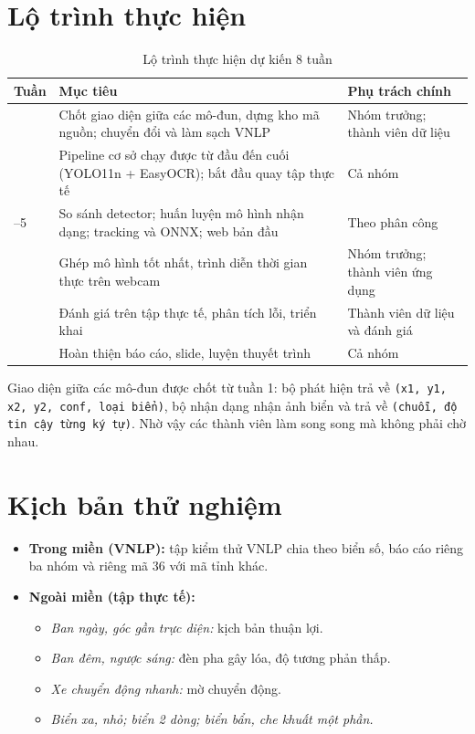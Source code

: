 \section{Lộ trình thực hiện}

\begin{table}[H]
\centering
\small
\begin{tabularx}{\textwidth}{|>{\centering}p{1.2cm}|>{\RaggedRight}X|>{\RaggedRight\arraybackslash}p{4.0cm}|}
\hline
\textbf{Tuần} & \textbf{Mục tiêu} & \textbf{Phụ trách chính} \\
\hline
1 & Chốt giao diện giữa các mô-đun, dựng kho mã nguồn; chuyển đổi và làm sạch VNLP & Nhóm trưởng; thành viên dữ liệu \\
\hline
2 & Pipeline cơ sở chạy được từ đầu đến cuối (YOLO11n + EasyOCR); bắt đầu quay tập thực tế & Cả nhóm \\
\hline
3--5 & So sánh detector; huấn luyện mô hình nhận dạng; tracking và ONNX; web bản đầu & Theo phân công \\
\hline
6 & Ghép mô hình tốt nhất, trình diễn thời gian thực trên webcam & Nhóm trưởng; thành viên ứng dụng \\
\hline
7 & Đánh giá trên tập thực tế, phân tích lỗi, triển khai & Thành viên dữ liệu và đánh giá \\
\hline
8 & Hoàn thiện báo cáo, slide, luyện thuyết trình & Cả nhóm \\
\hline
\end{tabularx}
\caption{Lộ trình thực hiện dự kiến 8 tuần}
\label{tab:timeline}
\end{table}

Giao diện giữa các mô-đun được chốt từ tuần 1: bộ phát hiện trả về \texttt{(x1, y1, x2, y2, conf, loại biển)}, bộ nhận dạng nhận ảnh biển và trả về \texttt{(chuỗi, độ tin cậy từng ký tự)}. Nhờ vậy các thành viên làm song song mà không phải chờ nhau.

\section{Kịch bản thử nghiệm}

\begin{itemize}
  \item \textbf{Trong miền (VNLP):} tập kiểm thử VNLP chia theo biển số, báo cáo riêng ba nhóm và riêng mã 36 với mã tỉnh khác.
  \item \textbf{Ngoài miền (tập thực tế):}
  \begin{itemize}
    \item \textit{Ban ngày, góc gần trực diện:} kịch bản thuận lợi.
    \item \textit{Ban đêm, ngược sáng:} đèn pha gây lóa, độ tương phản thấp.
    \item \textit{Xe chuyển động nhanh:} mờ chuyển động.
    \item \textit{Biển xa, nhỏ; biển 2 dòng; biển bẩn, che khuất một phần.}
  \end{itemize}
\end{itemize}

